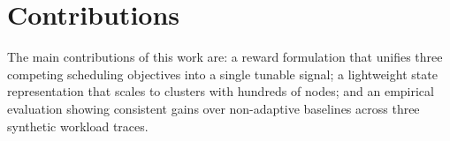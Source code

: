 \section{Contributions}
The main contributions of this work are: a reward formulation that unifies
three competing scheduling objectives into a single tunable signal; a
lightweight state representation that scales to clusters with hundreds of
nodes; and an empirical evaluation showing consistent gains over
non-adaptive baselines across three synthetic workload traces.
